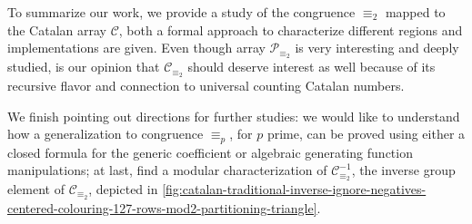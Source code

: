 To summarize our work, we provide a study of the congruence
$\equiv_{2}$ mapped to the Catalan array $\mathcal{C}$, both a formal
approach to characterize different regions and implementations are
given. Even though array $\mathcal{P}_{\equiv_{2}}$ is very
interesting and deeply studied, is our opinion that
$\mathcal{C}_{\equiv_{2}}$ should deserve interest as well because of
its recursive flavor and connection to universal counting Catalan
numbers.

We finish pointing out directions for further studies: we would like
to understand how a generalization to congruence $\equiv_{p}$, for $p$
prime, can be proved using either a closed formula for the generic
coefficient or algebraic generating function manipulations; at last,
find a modular characterization of $\mathcal{C}_{\equiv_{2}}^{-1}$,
the inverse group element of $\mathcal{C}_{\equiv_{2}}$, depicted in
\autoref{fig:catalan-traditional-inverse-ignore-negatives-centered-colouring-127-rows-mod2-partitioning-triangle}.


